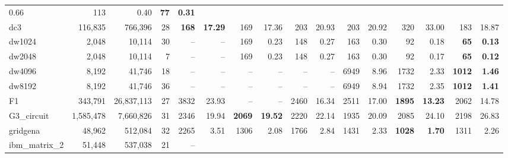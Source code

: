 \begin{landscape}
\begin{table}
\begin{tabular}{lrrr||rr|rr|rr|rr|rr|rr}
            0.66  &      113 &     0.40  & \textbf{      77} & \textbf{    
            0.31}\\
                   dc3  &  116,835  &  766,396  &  28  & \textbf{     168} & 
                   \textbf{   17.29}  &      169 &    17.36  &      203 &    
                   20.93  &      203 &    20.92  &      320 &    33.00  &      
                   183 &    18.87\\
                dw1024  &  2,048  &  10,114  &  30  &       --  &       --   
                &      169 &     0.23  &      148 &     0.27  &      163 &     
                0.30  &       92 &     0.18  & \textbf{      65} & \textbf{    
                0.13}\\
                dw2048  &  2,048  &  10,114  &  7  &       --  &       --   
                &      169 &     0.23  &      148 &     0.27  &      163 &     
                0.30  &       92 &     0.17  & \textbf{      65} & \textbf{    
                0.12}\\
                dw4096  &  8,192  &  41,746  &  18  &       --  &       --   
                &       --  &       --   &       --  &       --   &     6949 
                &     8.96  &     1732 &     2.33  & \textbf{    1012} & 
                \textbf{    1.46}\\
                dw8192  &  8,192  &  41,746  &  36  &       --  &       --   
                &       --  &       --   &       --  &       --   &     6949 
                &     8.94  &     1732 &     2.35  & \textbf{    1012} & 
                \textbf{    1.41}\\
                    F1  &  343,791  &  26,837,113  &  27  &     3832 &    
                    23.93  &       --  &       --   &     2460 &    16.34  
                    &     2511 &    17.00  & \textbf{    1895} & \textbf{   
                    13.23}  &     2062 &    14.78\\
            G3\_circuit  &  1,585,478  &  7,660,826  &  31  &     2346 &    
            19.94  & \textbf{    2069} & \textbf{   19.52}  &     2220 &    
            22.14  &     1935 &    20.09  &     2085 &    24.10  &     2198 
            &    26.83\\
              gridgena  &  48,962  &  512,084  &  32  &     2265 &     3.51  
              &     1306 &     2.08  &     1766 &     2.84  &     1431 &     
              2.33  & \textbf{    1028} & \textbf{    1.70}  &     1311 &     
              2.26\\
          ibm\_matrix\_2  &  51,448  &  537,038  &  21  &       --  &       

\end{tabular}
\end{table}
\end{landscape}
